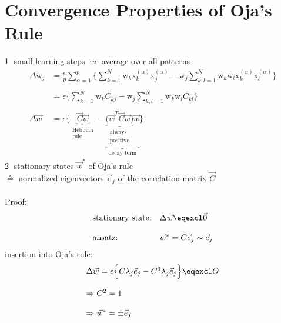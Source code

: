 \documentclass[a4paper,11pt]{article}
\begin{document}
\section{Convergence Properties of Oja's Rule}
\textcircled{1} small learning steps $\leadsto$ average over all patterns
\begin{equation}
	\begin{array}{ll}
	\Delta \mathrm{w}_j 
		& = \frac{\epsilon}{p} \sum\limits_{\alpha = 1}^p
			\bigg\{ \sum\limits_{k = 1}^N \mathrm{w}_k 
			\mathrm{x}_k^{(\alpha)} \mathrm{x}_j^{(\alpha)}
			- \mathrm{w}_j \sum\limits_{k,l = 1}^N
			\mathrm{w}_k \mathrm{w}_l 
			\mathrm{x}_k^{(\alpha)} \mathrm{x}_l^{(\alpha)}
			\bigg\} \\\\
		& = \epsilon \bigg\{ \sum\limits_{k = 1}^N 
			\mathrm{w}_k C_{kj} - \mathrm{w}_j
			\sum\limits_{k,l = 1}^N \mathrm{w}_k \mathrm{w}_l
			C_{kl}
			\bigg\} \\\\
	\Delta \vec{w} & = \epsilon \Big\{ 
		\underbrace{ \vec{C} \vec{w} }_{
			\substack{\text{Hebbian} \\ \text{rule}}}
		- \underbrace{ 
			\underbrace{ \big( \vec{w}^T \vec{C} \vec{w} \big) }_{
			\substack{\text{always} \\ \text{positive}}}
			\vec{w} }_{\text{decay term}} \Big\}
	\end{array}
\end{equation}
\textcircled{2} stationary states $\vec{w}^*$ of Oja's rule \\
\indent$\corresponds$ normalized eigenvectors $\vec{e}_j$ of the correlation matrix $\vec{C}$\\\\
Proof:
\[ \begin{array}{ll}
	\text{stationary state:} 
	& \Delta \vec{w} \eqexcl \vec{0} \\\\
	\text{ansatz:} 
	& \vec{w}^* = C \vec{e}_j \sim  \vec{e}_j
\end{array} \]
insertion into Oja's rule:
\begin{equation}
	\begin{array}{l}
	\Delta \vec{w} = \epsilon \Big\{ C \lambda_j \vec{e}_j
		- C^3 \lambda_j \vec{e}_j 
		\Big\} \eqexcl O \\\\
	\Rightarrow C^2 = 1 \\\\
	\Rightarrow \vec{w}^* = \pm \vec{e}_j
	\end{array}
\end{equation}
\end{document}
